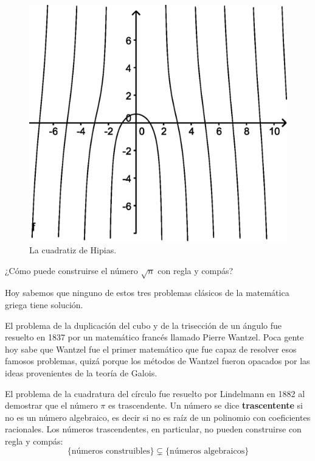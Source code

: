 \begin{figure}
   \centering
   \includegraphics[scale=0.3]{images/cuadratiz}
   \caption{La cuadratiz de Hipias.}
   \label{fig:cuadratiz}
\end{figure}



\begin{exercise}
	¿Cómo puede construirse el número $\sqrt{n}$ con regla y compás?
\end{exercise}

Hoy sabemos que ninguno de estos tres problemas clásicos de la matemática
griega tiene solución. 

El problema de la duplicación del cubo y de la
trisección de un ángulo fue resuelto en 1837 por un matemático francés llamado
Pierre Wantzel. Poca gente hoy sabe que Wantzel fue el primer matemático que
fue capaz de resolver esos famosos problemas, quizá porque los métodos de
Wantzel fueron opacados por las ideas provenientes de la teoría de Galois.  

El
problema de la cuadratura del círculo fue resuelto por Lindelmann en 1882 al
demostrar que el número $\pi$ es trascendente. Un número se dice
\textbf{trascentente} si no es un número algebraico, es decir si no es raíz de
un polinomio con coeficientes racionales. Los números trascendentes, en
particular, no pueden construirse con regla y compás:
\[
	\{\text{números construibles}\}\subsetneq\{\text{números algebraicos}\}
\]

